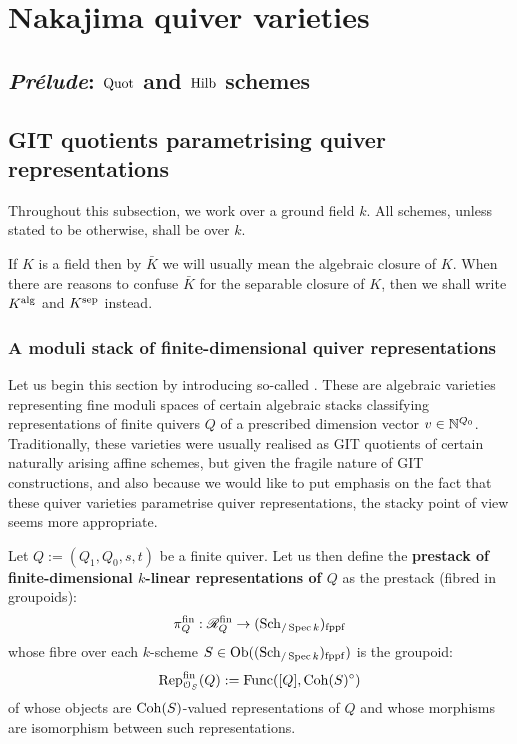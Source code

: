 \section{Nakajima quiver varieties}
    \subsection{\textit{Pr\'elude}: \texorpdfstring{$\mathrm{Quot}$}{} and \texorpdfstring{$\mathrm{Hilb}$}{} schemes}

    \subsection{GIT quotients parametrising quiver representations}
        \begin{convention}
            Throughout this subsection, we work over a ground field $k$. All schemes, unless stated to be otherwise, shall be over $k$.
        \end{convention}
        \begin{convention}
            If $K$ is a field then by $\bar{K}$ we will usually mean the algebraic closure of $K$. When there are reasons to confuse $\bar{K}$ for the separable closure of $K$, then we shall write $K^{\mathrm{alg}}$ and $K^{\mathrm{sep}}$ instead. 
        \end{convention}
        
        \subsubsection{A moduli stack of finite-dimensional quiver representations}
            Let us begin this section by introducing so-called . These are algebraic varieties representing fine moduli spaces of certain algebraic stacks classifying representations of finite quivers $Q$ of a prescribed dimension vector $v \in \mathbb{N}^{Q_0}$. Traditionally, these varieties were usually realised as GIT quotients of certain naturally arising affine schemes, but given the fragile nature of GIT constructions, and also because we would like to put emphasis on the fact that these quiver varieties parametrise quiver representations, the stacky point of view seems more appropriate. 
            \begin{definition} \label{def: quiver_representation_stacks}
                Let $Q := (Q_1, Q_0, s, t)$ be a finite quiver. Let us then define the \textbf{prestack of finite-dimensional $k$-linear representations of $Q$} as the prestack (fibred in groupoids):
                    $$\pi_Q^{\mathrm{fin}}: \mathscr{R}_Q^{\mathrm{fin}} \to (\mathrm{Sch}_{/\operatorname{Spec} k})_{\mathrm{fppf}}$$
                whose fibre over each $k$-scheme $S \in \mathrm{Ob}((\mathrm{Sch}_{/\operatorname{Spec} k})_{\mathrm{fppf}})$ is the groupoid:
                    $$\mathrm{Rep}_{\mathcal{O}_S}^{\mathrm{fin}}(Q) := \mathrm{Func}([Q], \mathrm{Coh}(S)^{\circ})$$
                of whose objects are $\mathrm{Coh}(S)$-valued representations of $Q$ and whose morphisms are isomorphism between such representations.  
            \end{definition}
            \begin{remark}
                
            \end{remark}
            
